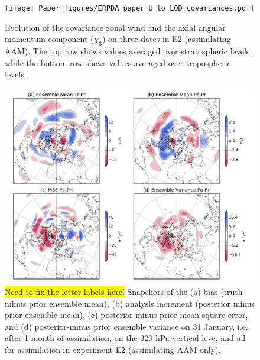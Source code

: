  \begin{figure}
	 \texttt{[image: Paper\_figures/ERPDA\_paper\_U\_to\_LOD\_covariances.pdf]}
	 \caption{Evolution of the covariance zonal wind and the axial angular momentum component ($\chi_3$) on three dates in E2 (assimilating AAM). The top row shows values averaged over stratospheric levels, while the bottom row shows values averaged over tropospheric levels.}
 \label{fig:covariances}
\end{figure}

 \begin{figure}
	 \includegraphics[width=\textwidth]{Paper_figures/ERPDA_paper_U_priorerror_vs_increment_vs_ER_31jan.pdf}
	 \caption{\hl{Need to fix the letter labels here!} Snapshots of the (a) bias (truth minus prior ensemble mean), (b) analysis increment (posterior minus prior ensemble mean), (c) posterior minus prior mean square error, and (d) posterior-minus prior ensemble variance on 31 January, i.e. after 1 month of assimilation, on the 320 hPa vertical leve, and all for assimilation in experiment E2 (assimilating AAM only). } 
 \label{fig:error_increments}
\end{figure}


